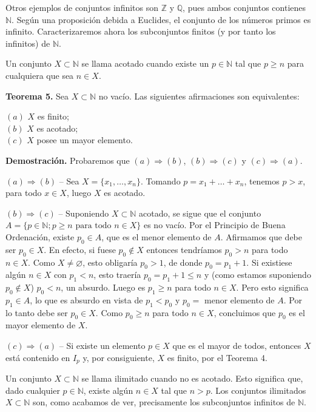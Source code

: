 \documentclass[12pt,oneside]{book}
\begin{document}
Otros ejemplos de conjuntos infinitos son \( \mathbb{Z} \) y \( \mathbb{Q} \), pues ambos conjuntos contienes \( \mathbb{N} \). Según una proposición debida a Euclides, el conjunto de los números primos es infinito. Caracterizaremos ahora los subconjuntos finitos (y por tanto los infinitos) de \( \mathbb{N} \).

Un conjunto \( X \subset \mathbb{N} \) se llama acotado cuando existe un \( p \in \mathbb{N} \) tal que \( p \geq n \) para cualquiera que sea \( n \in X \).

\textbf{Teorema 5.} Sea \( X \subset \mathbb{N} \) no vacío. Las siguientes afirmaciones son equivalentes:

$(a)$ \( X \) es finito;\\
$(b)$ \( X \) es acotado;\\
$(c)$ \( X \) posee un mayor elemento.

\textbf{Demostración.} Probaremos que $(a) \Rightarrow (b)$, $(b) \Rightarrow (c)$ y $(c) \Rightarrow (a)$.

$(a) \Rightarrow (b)$ – Sea \( X = \{x_1, \dots, x_n\} \). Tomando \( p = x_1 + \dots + x_n \), tenemos \( p > x \), para todo \( x \in X \), luego \( X \) es acotado.

$(b) \Rightarrow (c)$ – Suponiendo \( X \subset \mathbb{N} \) acotado, se sigue que el conjunto \( A = \{ p \in \mathbb{N} ; p \geq n \text{ para todo } n \in X \} \) es no vacío. Por el Principio de Buena Ordenación, existe \( p_0 \in A \), que es el menor elemento de \( A \). Afirmamos que debe ser \( p_0 \in X \). En efecto, si fuese \( p_0 \notin X \) entonces tendríamos \( p_0 > n \) para todo \( n \in X \). Como \( X \neq \varnothing \), esto obligaría \( p_0 > 1 \), de donde \( p_0 = p_1 + 1 \). Si existiese algún \( n \in X \) con \( p_1 < n \), esto traería \( p_0 = p_1 + 1 \leq n \) y (como estamos suponiendo \( p_0 \notin X \)) \( p_0 < n \), un absurdo. Luego es \( p_1 \geq n \) para todo \( n \in X \). Pero esto significa \( p_1 \in A \), lo que es absurdo en vista de \( p_1 < p_0 \) y \( p_0 = \) menor elemento de \( A \). Por lo tanto debe ser \( p_0 \in X \). Como \( p_0 \geq n \) para todo \( n \in X \), concluimos que \( p_0 \) es el mayor elemento de \( X \).

$(c) \Rightarrow (a)$ – Si existe un elemento \( p \in X \) que es el mayor de todos, entonces \( X \) está contenido en \( I_p \) y, por consiguiente, \( X \) es finito, por el Teorema 4.

Un conjunto \( X \subset \mathbb{N} \) se llama ilimitado cuando no es acotado. Esto significa que, dado cualquier \( p \in \mathbb{N} \), existe algún \( n \in X \) tal que \( n > p \). Los conjuntos ilimitados \( X \subset \mathbb{N} \) son, como acabamos de ver, precisamente los subconjuntos infinitos de \( \mathbb{N} \).
\end{document}
